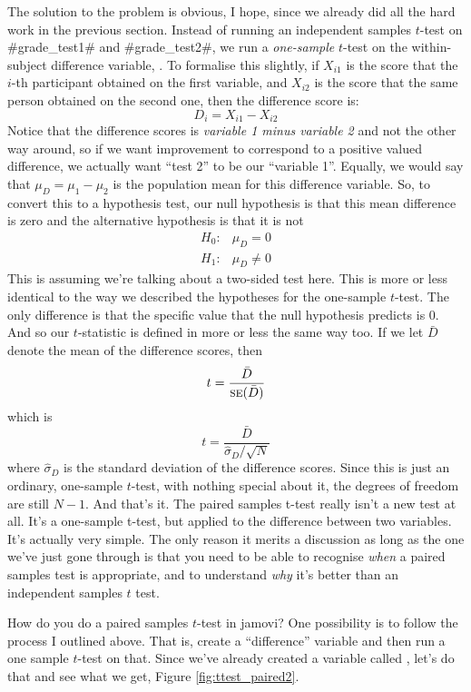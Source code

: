 The solution to the problem is obvious, I hope, since we already did all the hard work in the previous section. Instead of running an independent samples $t$-test on \rtextverb#grade\_test1# and \rtextverb#grade\_test2#, we run a {\it one-sample} $t$-test on the within-subject difference variable, . To formalise this slightly, if $X_{i1}$ is the score that the $i$-th participant obtained on the first variable, and $X_{i2}$ is the score that the same person obtained on the second one, then the difference score is:
$$
D_{i} = X_{i1} - X_{i2} 
$$
Notice that the difference scores is {\it variable 1 minus variable 2} and not the other way around, so if we want improvement to correspond to a positive valued difference, we actually want ``test 2'' to be our ``variable 1''. Equally, we would say that $\mu_D = \mu_1 - \mu_2$ is the population mean for this difference variable. So, to convert this to a hypothesis test, our null hypothesis is that this mean difference is zero and the alternative hypothesis is that it is not
$$
\begin{array}{ll}
H_0: & \mu_D = 0  \\
H_1: & \mu_D \neq 0
\end{array}
$$
This is assuming we're talking about a two-sided test here. This is more or less identical to the way we described the hypotheses for the one-sample $t$-test. The only difference is that the specific value that the null hypothesis predicts is 0. And so our $t$-statistic is defined in more or less the same way too. If we let $\bar{D}$ denote the mean of the difference scores, then 
$$
t = \frac{\bar{D}}{\mbox{\textsc{se}}(\bar{D})}
$$
which is 
$$
t = \frac{\bar{D}}{\hat\sigma_D / \sqrt{N}}
$$
where $\hat\sigma_D$ is the standard deviation of the difference scores. Since this is just an ordinary, one-sample $t$-test, with nothing special about it, the degrees of freedom are still $N-1$. And that’s it. The paired samples t-test really isn’t a new test at all. It’s a one-sample t-test, but applied to the difference between two variables. It's actually very simple. The only reason it merits a discussion as long as the one we've just gone through is that you need to be able to recognise {\it when} a paired samples test is appropriate, and to understand {\it why} it's better than an independent samples $t$ test. 


How do you do a paired samples $t$-test in jamovi? One possibility is to follow the process I outlined above. That is, create a ``difference'' variable and then run a one sample $t$-test on that. Since we've already created a variable called , let's do that and see what we get, Figure \ref{fig:ttest_paired2}.

